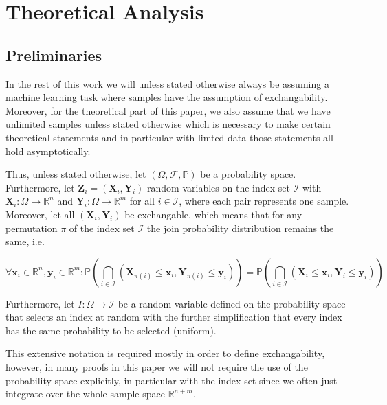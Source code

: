\chapter{Theoretical Analysis}\label{chap:theoretical}

\section{Preliminaries}\label{sec:preliminaries}

In the rest of this work we will unless stated otherwise always be assuming a machine learning task where samples have the assumption of exchangability. Moreover, for the theoretical part of this paper, we also assume that we have unlimited samples unless stated otherwise which is necessary to make certain theoretical statements and in particular with limted data those statements all hold asymptotically.

Thus, unless stated otherwise, let $\left(\Omega, \mathcal{F}, \mathbb{P}\right)$ be a probability space. Furthermore, let $\mathbf{Z}_i = (\mathbf{X}_i, \mathbf{Y}_i)$ random variables on the index set $\mathcal{I}$ with $\mathbf{X}_i: \Omega \to \mathbb{R}^n$ and $\mathbf{Y}_i: \Omega \to \mathbb{R}^m$ for all $i\in\mathcal{I}$, where each pair represents one sample. Moreover, let all $(\mathbf{X}_i, \mathbf{Y}_i)$ be exchangable, which means that for any permutation $\pi$ of the index set $\mathcal{I}$ the join probability distribution remains the same, i.e.

\begin{equation}
    \forall \mathbf{x}_i \in \mathbb{R}^n, \mathbf{y}_i \in \mathbb{R}^m:
    \mathbb{P}\left( \bigcap_{i\in\mathcal{I}} (\mathbf{X}_{\pi(i)} \leq \mathbf{x}_i,
        \mathbf{Y}_{\pi(i)} \leq \mathbf{y}_i)\right) = \mathbb{P}\left(
    \bigcap_{i\in\mathcal{I}} (\mathbf{X}_{i} \leq \mathbf{x}_i, \mathbf{Y}_{i} \leq
        \mathbf{y}_i)\right)
\end{equation}

Furthermore, let $I: \Omega \to \mathcal{I}$ be a random variable defined on the probability space that selects an index at random with the further simplification that every index has the same probability to be selected (uniform).

This extensive notation is required mostly in order to define exchangability, however, in many proofs in this paper we will not require the use of the probability space explicitly, in particular with the index set since we often just integrate over the whole sample space $\mathbb{R}^{n+m}$.

